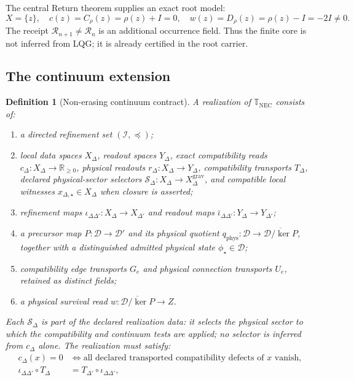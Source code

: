 \documentclass[11pt]{article}
\newtheorem{definition}[theorem]{Definition}
\newcommand{\R}{\mathbb R}
\newcommand{\NEC}{\mathbb T_{\mathrm{NEC}}}
\begin{document}
The central Return theorem supplies an exact root model:
\[
X=\{z\},
\quad
c(z)=C_\rho(z)=\rho(z)+I=0,
\quad
w(z)=D_\rho(z)=\rho(z)-I=-2I\neq0.
\]
The receipt $\mathcal R_{n+1}\neq\mathcal R_n$ is an additional occurrence field. Thus the finite core is not inferred from LQG; it is already certified in the root carrier.

\subsection{The continuum extension}

\begin{definition}[Non-erasing continuum contract]
A realization of $\NEC$ consists of:
\begin{enumerate}[label=(\roman*)]
\item a directed refinement set $(\mathcal I,\preceq)$;
\item local data spaces $X_\Delta$, readout spaces $Y_\Delta$, exact compatibility reads $c_\Delta:X_\Delta\to\R_{\ge0}$, physical readouts $r_\Delta:X_\Delta\to Y_\Delta$, compatibility transports $T_\Delta$, declared physical-sector selectors $\mathcal S_\Delta:X_\Delta\to X_\Delta^{\mathrm{grav}}$, and compatible local witnesses $x_{\Delta,\star}\in X_\Delta$ when closure is asserted;
\item refinement maps $\iota_{\Delta\Delta'}:X_\Delta\to X_{\Delta'}$ and readout maps $\bar\iota_{\Delta\Delta'}:Y_\Delta\to Y_{\Delta'}$;
\item a precursor map $P:\mathcal D\to\mathcal D'$ and its physical quotient $q_{\mathrm{phys}}:\mathcal D\to\overline{\mathcal D/\ker P}$, together with a distinguished admitted physical state $\phi_\star\in\mathcal D$;
\item compatibility edge transports $G_e$ and physical connection transports $U_e$, retained as distinct fields;
\item a physical survival read $w:\overline{\mathcal D/\ker P}\to Z$.
\end{enumerate}
Each $\mathcal S_\Delta$ is part of the declared realization data: it selects the physical sector to which the compatibility and continuum tests are applied; no selector is inferred from $c_\Delta$ alone.
The realization must satisfy:
\begin{align}
 c_\Delta(x)=0
 &\iff \text{all declared transported compatibility defects of }x\text{ vanish},
\tag{NEC1}\label{eq:nec1}\\
\iota_{\Delta\Delta'}\circ T_\Delta
&=T_{\Delta'}\circ\iota_{\Delta\Delta'},

\end{align}
\end{definition}
\end{document}
